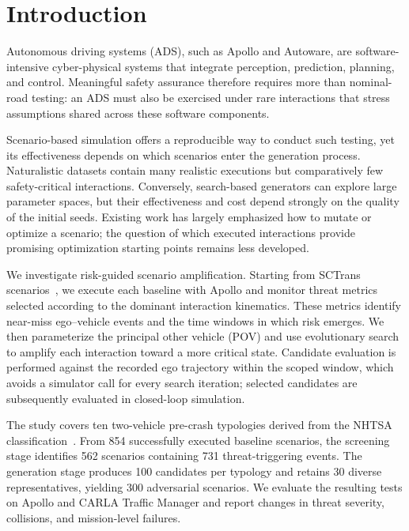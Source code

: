 \section{Introduction}

Autonomous driving systems (ADS), such as Apollo and Autoware, are software-intensive cyber-physical systems that integrate perception, prediction, planning, and control. Meaningful safety assurance therefore requires more than nominal-road testing: an ADS must also be exercised under rare interactions that stress assumptions shared across these software components.

Scenario-based simulation offers a reproducible way to conduct such testing, yet its effectiveness depends on which scenarios enter the generation process. Naturalistic datasets contain many realistic executions but comparatively few safety-critical interactions. Conversely, search-based generators can explore large parameter spaces, but their effectiveness and cost depend strongly on the quality of the initial seeds. Existing work has largely emphasized how to mutate or optimize a scenario; the question of which executed interactions provide promising optimization starting points remains less developed.

We investigate risk-guided scenario amplification. Starting from SCTrans scenarios~\cite{dai_sctrans_2024}, we execute each baseline with Apollo and monitor threat metrics selected according to the dominant interaction kinematics. These metrics identify near-miss ego--vehicle events and the time windows in which risk emerges. We then parameterize the principal other vehicle (POV) and use evolutionary search to amplify each interaction toward a more critical state. Candidate evaluation is performed against the recorded ego trajectory within the scoped window, which avoids a simulator call for every search iteration; selected candidates are subsequently evaluated in closed-loop simulation.

The study covers ten two-vehicle pre-crash typologies derived from the NHTSA classification~\cite{noauthor_pre-crash_nodate}. From 854 successfully executed baseline scenarios, the screening stage identifies 562 scenarios containing 731 threat-triggering events. The generation stage produces 100 candidates per typology and retains 30 diverse representatives, yielding 300 adversarial scenarios. We evaluate the resulting tests on Apollo and CARLA Traffic Manager and report changes in threat severity, collisions, and mission-level failures.

